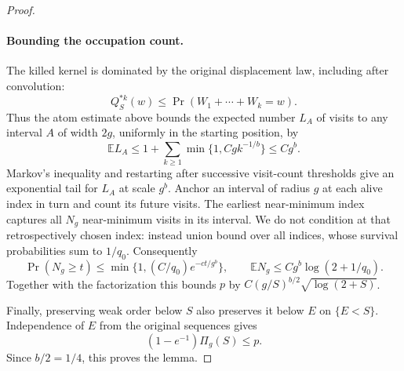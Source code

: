 \begin{proof}
\paragraph{Bounding the occupation count.}
The killed kernel is dominated by the original displacement law, including
after convolution:
\[
 Q_S^{*k}(w)\le\Pr(W_1+\cdots+W_k=w).
\]
Thus the atom estimate above bounds the expected number $L_A$ of visits
to any interval $A$ of width $2g$, uniformly in the starting position, by
\[
 \mathbb E L_A\le 1+\sum_{k\ge1}\min\{1,Cgk^{-1/b}\}
 \le Cg^b.
\]
Markov's inequality and restarting after successive visit-count thresholds
give an exponential tail for $L_A$ at scale $g^b$. Anchor an interval of
radius $g$ at each alive index in turn and count its future visits. The
earliest near-minimum index captures all $N_g$ near-minimum visits in its
interval. We do not condition at that retrospectively chosen index:
instead union bound over all indices, whose survival probabilities sum to
$1/q_0$. Consequently
\[
 \Pr(N_g\ge t)\le
 \min\{1,(C/q_0)e^{-ct/g^b}\},\qquad
 \mathbb E N_g\le Cg^b\log(2+1/q_0).
\]
Together with the factorization this bounds $p$ by
$C(g/S)^{b/2}\sqrt{\log(2+S)}$.

Finally, preserving weak order below $S$ also preserves it below $E$ on
$\{E<S\}$. Independence of $E$ from the original sequences gives
\[
 (1-e^{-1})\Pi_g(S)\le p.
\]
Since $b/2=1/4$, this proves the lemma.
\end{proof}

